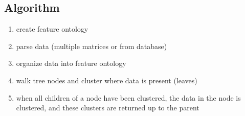\documentclass[12pt]{ucthesis}
\begin{document}
      \subsection{Algorithm}
         \begin{enumerate}
            \item create feature ontology
            \item parse data (multiple matrices or from database)
            \item organize data into feature ontology
            \item walk tree nodes and cluster where data is present (leaves)
            \item when all children of a node have been clustered, the data in the
                  node is clustered, and these clusters are returned up to the
                  parent
         \end{enumerate}
\end{document}
